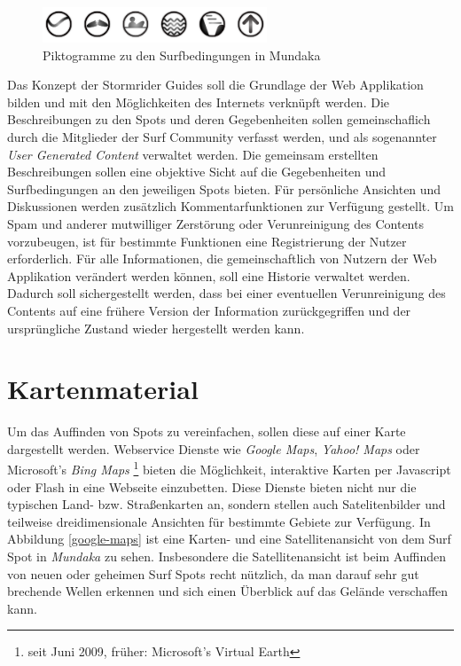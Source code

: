 \begin{figure}[t]
  \begin{center}
    \includegraphics[height=40px]{bilder/mundaka-conditions}
    \caption{Piktogramme zu den Surfbedingungen in Mundaka}
    \label{piktogramm}
  \end{center}
\end{figure}

Das Konzept der Stormrider Guides soll die Grundlage der Web
Applikation bilden und mit den Möglichkeiten des Internets verknüpft
werden. Die Beschreibungen zu den Spots und deren Gegebenheiten sollen
gemeinschaflich durch die Mitglieder der Surf Community verfasst
werden, und als sogenannter \textit{User Generated Content} verwaltet
werden. Die gemeinsam erstellten Beschreibungen sollen eine objektive
Sicht auf die Gegebenheiten und Surfbedingungen an den jeweiligen
Spots bieten. Für persönliche Ansichten und Diskussionen werden
zusätzlich Kommentarfunktionen zur Verfügung gestellt. Um Spam und
anderer mutwilliger Zerstörung oder Verunreinigung des Contents
vorzubeugen, ist für bestimmte Funktionen eine Registrierung der
Nutzer erforderlich. Für alle Informationen, die gemeinschaftlich von
Nutzern der Web Applikation verändert werden können, soll eine
Historie verwaltet werden. Dadurch soll sichergestellt werden, dass
bei einer eventuellen Verunreinigung des Contents auf eine frühere
Version der Information zurückgegriffen und der ursprüngliche Zustand
wieder hergestellt werden kann.

\section{Kartenmaterial}

Um das Auffinden von Spots zu vereinfachen, sollen diese auf einer
Karte dargestellt werden. Webservice Dienste wie \textit{Google Maps},
\textit{Yahoo! Maps} oder Microsoft's \textit{Bing Maps}
\footnote{seit Juni 2009, früher: Microsoft's Virtual Earth} bieten
die Möglichkeit, interaktive Karten per Java\-script oder Flash in
eine Webseite einzubetten. Diese Dienste bieten nicht nur die
typischen Land- bzw. Straßenkarten an, sondern stellen auch
Satelitenbilder und teilweise dreidimensionale Ansichten für bestimmte
Gebiete zur Verfügung. In Abbildung \ref{google-maps} ist eine Karten-
und eine Satellitenansicht von dem Surf Spot in \textit{Mundaka} zu
sehen. Insbesondere die Satellitenansicht ist beim Auffinden von neuen
oder geheimen Surf Spots recht nützlich, da man darauf sehr gut
brechende Wellen erkennen und sich einen Überblick auf das Gelände
verschaffen kann.


